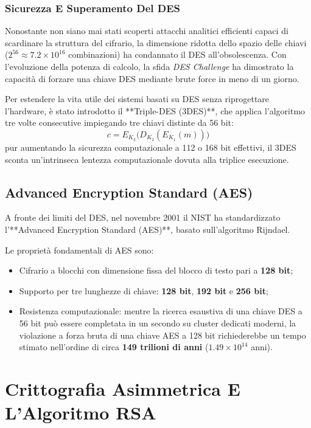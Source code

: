 \documentclass[11pt, a4paper]{article}
\begin{document}
\subsubsection{Sicurezza E Superamento Del DES}
Nonostante non siano mai stati scoperti attacchi analitici efficienti capaci di scardinare la struttura del cifrario, la dimensione ridotta dello spazio delle chiavi ($2^{56} \approx 7.2 \times 10^{16}$ combinazioni) ha condannato il DES all'obsolescenza. Con l'evoluzione della potenza di calcolo, la sfida \emph{DES Challenge} ha dimostrato la capacità di forzare una chiave DES mediante brute force in meno di un giorno.

Per estendere la vita utile dei sistemi basati su DES senza riprogettare l'hardware, è stato introdotto il **Triple-DES (3DES)**, che applica l'algoritmo tre volte consecutive impiegando tre chiavi distinte da 56 bit:
\[
c = E_{K_3}\bigl(D_{K_2}(E_{K_1}(m))\bigr)
\]
pur aumentando la sicurezza computazionale a 112 o 168 bit effettivi, il 3DES sconta un'intrinseca lentezza computazionale dovuta alla triplice esecuzione.

\subsection{Advanced Encryption Standard (AES)}

A fronte dei limiti del DES, nel novembre 2001 il NIST ha standardizzato l'**Advanced Encryption Standard (AES)**, basato sull'algoritmo Rijndael.

Le proprietà fondamentali di AES sono:
\begin{itemize}[leftmargin=*]
    \item Cifrario a blocchi con dimensione fissa del blocco di testo pari a \textbf{128 bit};
    \item Supporto per tre lunghezze di chiave: \textbf{128 bit}, \textbf{192 bit} e \textbf{256 bit};
    \item Resistenza computazionale: mentre la ricerca esaustiva di una chiave DES a 56 bit può essere completata in un secondo su cluster dedicati moderni, la violazione a forza bruta di una chiave AES a 128 bit richiederebbe un tempo stimato nell'ordine di circa \textbf{149 trilioni di anni} ($1.49 \times 10^{14}$ anni).
\end{itemize}

\newpage

\section{Crittografia Asimmetrica E L'Algoritmo RSA}
\end{document}
